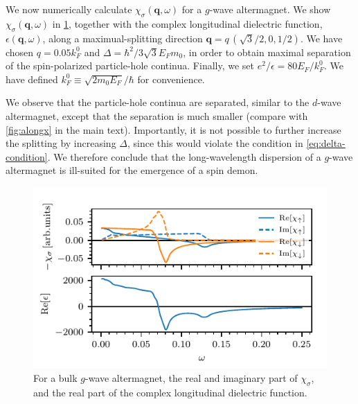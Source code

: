 \documentclass[aps,prb,reprint,twocolumns,superscriptaddress,nofootinbib]{revtex4-2}
\newcommand{\kF}{k_{F}}
\begin{document}
	
	
	We now numerically calculate $\chi_{\sigma}(\bm q,\omega)$ for a $g$-wave altermagnet. We show $\chi_{\sigma}(\bm q,\omega)$ in \cref{fig:g-wave}, together with the complex longitudinal dielectric function, $\epsilon(\bm q,\omega)$, along a maximual-splitting direction $\bm q = q\, \left(\sqrt{3}/2,0,1/2\right)$. We have chosen $q=0.05\kF^0$ and $\Delta ={\hbar^2}/{3\sqrt{3}E_F m_0 }$, in order to obtain maximal separation of the spin-polarized particle-hole continua. Finally, we set $e^2/\epsilon = 80 E_F/\kF^0$. We have defined $\kF^0\equiv \sqrt{2m_0E_F}/\hbar$ for convenience. 
	
	We observe that the particle-hole continua are separated, similar to the $d$-wave altermagnet, except that the separation is much smaller (compare with \cref{fig:alongx} in the main text). Importantly, it is not possible to further increase the splitting by increasing $\Delta$, since this would violate the condition in \cref{eq:delta-condition}. We therefore conclude that the long-wavelength dispersion of a $g$-wave altermagnet is ill-suited for the emergence of a spin demon.
	
	\begin{figure}
		\includegraphics{g-wave}
		\caption{For a bulk $g$-wave altermagnet, the real and imaginary part of $\chi_{\sigma}$, and the real part of the complex longitudinal dielectric function.}
		\label{fig:g-wave}
	\end{figure}
	
	
	
	
	
\end{document}
